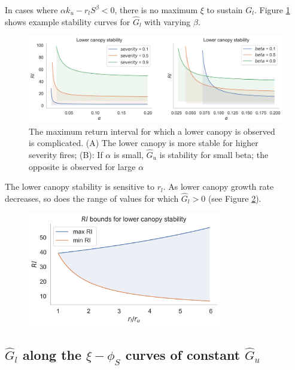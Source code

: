 \documentclass{article}
\begin{document}
In cases where ${\alpha k_u - r_l S^\beta} < 0$, there is no maximum $\xi$ to sustain $G_l$.
Figure \ref{fig:G_l_stability_v_alpha} shows example stability curves for $\hat G_l$ with varying $\beta$.
        
 \begin{figure}[h]
 \centering
\includegraphics[width=40pc]{../fire_plots/G_l_stability_v_alpha}
 \caption{ The maximum return interval for which a lower canopy is observed is complicated.  (A) The lower canopy is more stable for higher severity fires; 
 (B): If  $\alpha$ is small, $\hat G_u$ is stability for small beta; the opposite is observed for large $\alpha$}
 \label{fig:G_l_stability_v_alpha}
 \end{figure}
   

The lower canopy stability is sensitive to $r_l$. As lower canopy growth rate decreases, so does the range of values for which $\hat G_l > 0$ (see Figure \ref{fig:G_l_stability_v_rl}).

 \begin{figure}[h]
 \centering
\includegraphics[width=20pc]{../fire_plots/G_l_stability_v_rl}
 \caption{ }
 \label{fig:G_l_stability_v_rl}
 \end{figure}
  

  \subsection{$\hat G_l$ along the  $\xi - \phi_S$ curves of constant $\hat G_u$}
\end{document}
